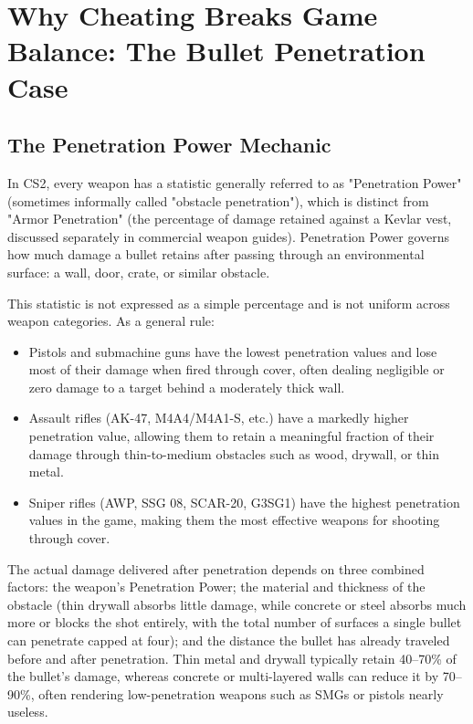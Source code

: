 \chapter{Why Cheating Breaks Game Balance: The Bullet Penetration Case}
\label{annexe:three}

\fancyhead[LE]{\textsc{\chaptername~\thechapter}}

\section{The Penetration Power Mechanic}

In CS2, every weapon has a statistic generally referred to as "Penetration Power" (sometimes informally called "obstacle penetration"), which is distinct from "Armor Penetration" (the percentage of damage retained against a Kevlar vest, discussed separately in commercial weapon guides). Penetration Power governs how much damage a bullet retains after passing through an environmental surface: a wall, door, crate, or similar obstacle.

This statistic is not expressed as a simple percentage and is not uniform across weapon categories. As a general rule:

\begin{itemize}
    \item Pistols and submachine guns have the lowest penetration values and lose most of their damage when fired through cover, often dealing negligible or zero damage to a target behind a moderately thick wall.
    \item Assault rifles (AK-47, M4A4/M4A1-S, etc.) have a markedly higher penetration value, allowing them to retain a meaningful fraction of their damage through thin-to-medium obstacles such as wood, drywall, or thin metal.
    \item Sniper rifles (AWP, SSG 08, SCAR-20, G3SG1) have the highest penetration values in the game, making them the most effective weapons for shooting through cover.
\end{itemize}

The actual damage delivered after penetration depends on three combined factors: the weapon's Penetration Power; the material and thickness of the obstacle (thin drywall absorbs little damage, while concrete or steel absorbs much more or blocks the shot entirely, with the total number of surfaces a single bullet can penetrate capped at four); and the distance the bullet has already traveled before and after penetration. Thin metal and drywall typically retain 40–70\% of the bullet's damage, whereas concrete or multi-layered walls can reduce it by 70–90\%, often rendering low-penetration weapons such as SMGs or pistols nearly useless.

